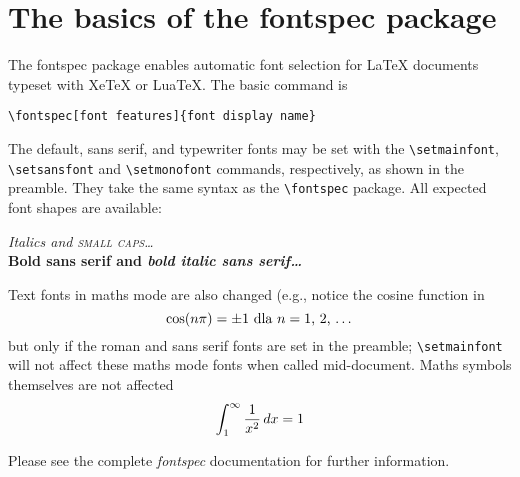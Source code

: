 \documentclass[a4paper,12pt]{article}
\begin{document}
\pagestyle{empty}

\section*{The basics of the \textsf{fontspec} package}

The \textsf{fontspec} package enables automatic font selection
for \LaTeX{} documents typeset with Xe\TeX{} or Lua\TeX.
The basic command is
\begin{center}
\verb|\fontspec[font features]{font display name}|
\end{center}
The default, sans serif, and typewriter fonts may be set with the
\verb|\setmainfont|, \verb|\setsansfont| and \verb|\setmonofont|
commands, respectively, as shown in the preamble. They take the
same syntax as the \verb|\fontspec| package. All expected font
shapes are available:
\begin{center}
  {\itshape Italics and \scshape small caps\dots}\\
  {\sffamily\bfseries Bold sans serif and \itshape bold italic sans serif\dots}
\end{center}
Text fonts in maths mode are also changed (e.g., notice the cosine function in
$$
  \cos(n\pi)=\pm 1 \hbox{ dla $n=1$, $2$, \ldots}
$$
but only if the roman and sans serif fonts are set in
the preamble; \verb|\setmainfont| will not affect these maths mode fonts when
called mid-document.
Maths symbols themselves are not affected
$$
  \int_1^\infty {1\over x^2}\,dx = 1
$$

Please see the complete \emph{fontspec} documentation for further information.
\end{document}
